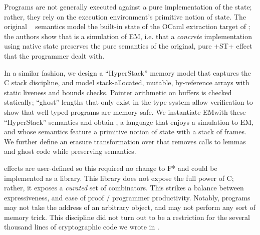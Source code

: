 Programs are not generally executed against a pure implementation of the state;
rather, they rely on the execution environment's primitive notion of
state. The original \emfst~\cite{dm4free} semantics model the
built-in state of the OCaml extraction target of \fstar; the authors show that
\emfst is a simulation of EM\fstar, i.e. that a \emph{concrete} implementation
using native state preserves the pure semantics of the original, pure \li+ST+
effect that the programmer dealt with.


In a similar fashion,
we design a ``HyperStack'' memory model that captures the
C stack discipline, and model stack-allocated, mutable, by-reference arrays with
static liveness and bounds checks.
Pointer arithmetic on buffers is checked statically;
``ghost'' lengths that only exist in the type system allow verification to show that
well-typed programs are memory safe. We instantiate EM\fstar with these
``HyperStack'' semantics and obtain \emfhst, a language that enjoys a simulation
to EM\fstar, and whose semantics feature a primitive notion of state with a
stack of frames.  We further define an erasure transformation over \emfhst that
removes calls to lemmas and ghost code while preserving semantics.

\fstar effects are user-defined so this required no change to F* and could be
implemented as a library. This library does not
expose the full power of C; rather, it exposes a \emph{curated} set of
combinators. This strikes a balance between expressiveness, and ease of proof /
programmer productivity. Notably, programs may not take the address of an
arbitrary object, and may not perform any sort of memory trick.  This discipline
did not turn out to be a restriction for the several thousand lines of
cryptographic code we wrote in \lowstar.

